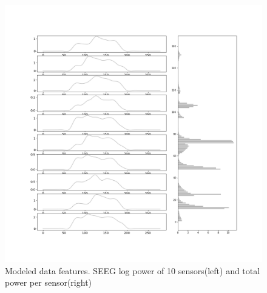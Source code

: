 \documentclass[12pt]{article}
\begin{document}
\begin{figure}[h!]
  \centering
  \includegraphics[width=\textwidth]{figures/modelled_data_features.png}
  \caption{Modeled data features. SEEG log power of 10 sensors(left) and total power per sensor(right)}
  \label{fig:data-features}
\end{figure}
\FloatBarrier
\end{document}
